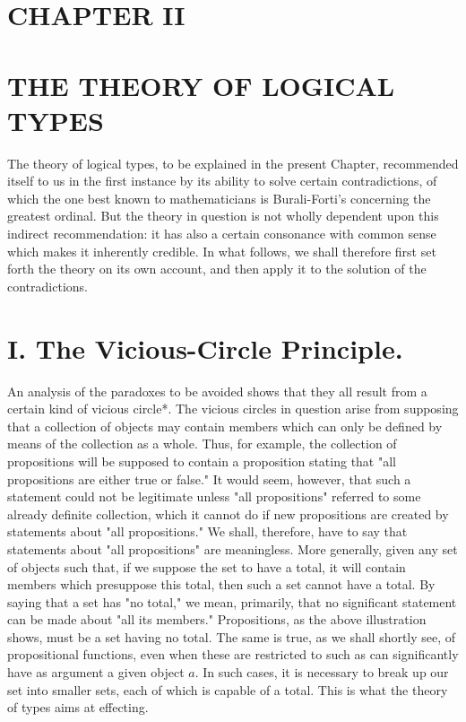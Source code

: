 \documentclass[10pt]{article}
\begin{document}
\section*{CHAPTER II}
\section*{THE THEORY OF LOGICAL TYPES}
The theory of logical types, to be explained in the present Chapter, recommended itself to us in the first instance by its ability to solve certain contradictions, of which the one best known to mathematicians is Burali-Forti's concerning the greatest ordinal. But the theory in question is not wholly dependent upon this indirect recommendation: it has also a certain consonance with common sense which makes it inherently credible. In what follows, we shall therefore first set forth the theory on its own account, and then apply it to the solution of the contradictions.

\section*{I. The Vicious-Circle Principle.}
An analysis of the paradoxes to be avoided shows that they all result from a certain kind of vicious circle*. The vicious circles in question arise from supposing that a collection of objects may contain members which can only be defined by means of the collection as a whole. Thus, for example, the collection of propositions will be supposed to contain a proposition stating that "all propositions are either true or false." It would seem, however, that such a statement could not be legitimate unless "all propositions" referred to some already definite collection, which it cannot do if new propositions are created by statements about "all propositions." We shall, therefore, have to say that statements about "all propositions" are meaningless. More generally, given any set of objects such that, if we suppose the set to have a total, it will contain members which presuppose this total, then such a set cannot have a total. By saying that a set has "no total," we mean, primarily, that no significant statement can be made about "all its members." Propositions, as the above illustration shows, must be a set having no total. The same is true, as we shall shortly see, of propositional functions, even when these are restricted to such as can significantly have as argument a given object $a$. In such cases, it is necessary to break up our set into smaller sets, each of which is capable of a total. This is what the theory of types aims at effecting.
\end{document}
